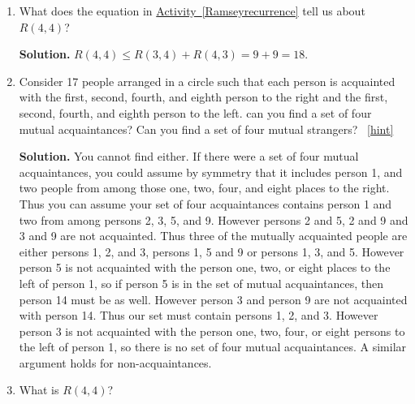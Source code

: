 \documentclass{book}
\begin{document}
\setcounter{project}{53}
\addtocounter{project}{-1}
\begin{activity}[]\label{Ramseybound2}
\leavevmode%
\begin{enumerate}[font=\bfseries,label=(\alph*),ref=\alph*]
\item\label{task-61} \hypertarget{p-450}{}%
What does the equation in \hyperref[Ramseyrecurrence]{Activity~\ref{Ramseyrecurrence}} tell us about \(R(4,4)\)?%
\par\smallskip%
\noindent\textbf{Solution.}\hypertarget{solution-50}{}\quad%
\hypertarget{p-451}{}%
\(R(4,4)\le R(3,4) + R(4,3) =9+9 = 18\).%
\item\label{task-62} \hypertarget{p-452}{}%
Consider 17 people arranged in a circle such that each person is acquainted with the first, second, fourth, and eighth person to the right and the first, second, fourth, and eighth person to the left.  can you find a set of four mutual acquaintances?  Can you find a set of four mutual strangers?%
~\hfill{\tiny\hyperlink{a-53.b}{[hint]}\hypertarget{q-53.b}{}}\par\smallskip%
\noindent\textbf{Solution.}\hypertarget{solution-51}{}\quad%
\hypertarget{p-454}{}%
You cannot find either. If there were a set of four mutual acquaintances, you could assume by symmetry that it includes person 1, and two people from among those one, two, four, and eight places to the right. Thus you can assume your set of four acquaintances contains person 1 and two from among persons 2, 3, 5, and 9. However persons 2 and 5, 2 and 9 and 3 and 9 are not acquainted. Thus three of the mutually acquainted people are either persons 1, 2, and 3, persons 1, 5 and 9 or persons 1, 3, and 5. However person 5 is not acquainted with the person one, two, or eight places to the left of person 1, so if person 5 is in the set of mutual acquaintances, then person 14 must be as well. However person 3 and person 9 are not acquainted with person 14. Thus our set must contain persons 1, 2, and 3. However person 3 is not acquainted with the person one, two, four, or eight persons to the left of person 1, so there is no set of four mutual acquaintances. A similar argument holds for non-acquaintances.%
\item\label{task-63} \hypertarget{p-455}{}%
What is \(R(4,4)\)?%
\end{enumerate}
\end{activity}
\end{document}
